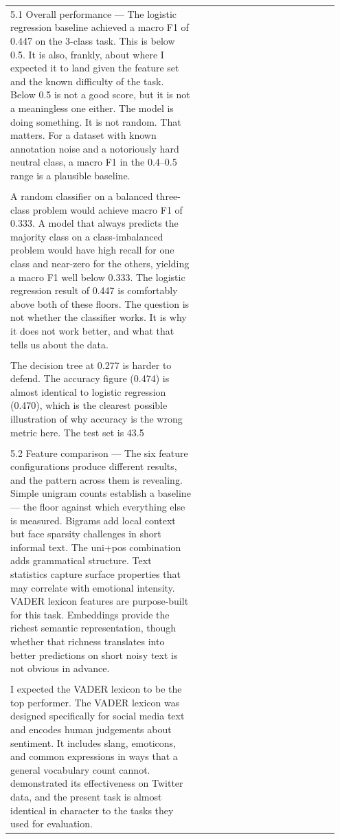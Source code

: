 \documentclass[11pt]{article}
\begin{document}
\begin{longtable}{|p{0.55\linewidth}|p{0.40\linewidth}|}
\hline
\rule{0pt}{3.5cm} & \\
\hline
5.1 Overall performance --- The logistic regression baseline achieved a macro F1 of 0.447 on the 3-class task. This is below 0.5. It is also, frankly, about where I expected it to land given the feature set and the known difficulty of the task. Below 0.5 is not a good score, but it is not a meaningless one either. The model is doing something. It is not random. That matters. For a dataset with known annotation noise and a notoriously hard neutral class, a macro F1 in the 0.4--0.5 range is a plausible baseline. & \\[2pt]
\hline
\rule{0pt}{3.5cm} & \\
\hline
A random classifier on a balanced three-class problem would achieve macro F1 of 0.333. A model that always predicts the majority class on a class-imbalanced problem would have high recall for one class and near-zero for the others, yielding a macro F1 well below 0.333. The logistic regression result of 0.447 is comfortably above both of these floors. The question is not whether the classifier works. It is why it does not work better, and what that tells us about the data. & \\[2pt]
\hline
\rule{0pt}{3.5cm} & \\
\hline
The decision tree at 0.277 is harder to defend. The accuracy figure (0.474) is almost identical to logistic regression (0.470), which is the clearest possible illustration of why accuracy is the wrong metric here. The test set is 43.5 & \\[2pt]
\hline
\rule{0pt}{3.5cm} & \\
\hline
5.2 Feature comparison --- The six feature configurations produce different results, and the pattern across them is revealing. Simple unigram counts establish a baseline --- the floor against which everything else is measured. Bigrams add local context but face sparsity challenges in short informal text. The uni+pos combination adds grammatical structure. Text statistics capture surface properties that may correlate with emotional intensity. VADER lexicon features are purpose-built for this task. Embeddings provide the richest semantic representation, though whether that richness translates into better predictions on short noisy text is not obvious in advance. & \\[2pt]
\hline
\rule{0pt}{3.5cm} & \\
\hline
I expected the VADER lexicon to be the top performer. The VADER lexicon was designed specifically for social media text and encodes human judgements about sentiment. It includes slang, emoticons, and common expressions in ways that a general vocabulary count cannot. demonstrated its effectiveness on Twitter data, and the present task is almost identical in character to the tasks they used for evaluation. & \\[2pt]

\end{longtable}
\end{document}

